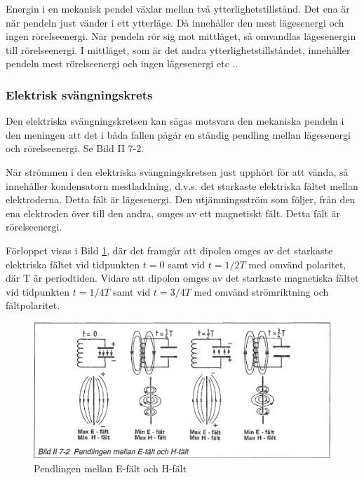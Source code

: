 Energin i en mekanisk pendel växlar mellan två
ytterlighetstillstånd. Det ena är när pendeln just vänder i ett
ytterläge. Då innehåller den mest lägesenergi och ingen
rörelseenergi. När pendeln rör sig mot mittläget, så omvandlas
lägesenergin till rörelseenergi. I mittläget, som är det andra
ytterlighetstillståndet, innehåller pendeln mest rörelseenergi och
ingen lägesenergi etc ..

\subsubsection{Elektrisk svängningskrets}

Den elektriska svängningskretsen kan sägas motsvara den mekaniska
pendeln i den meningen att det i båda fallen pågår en ständig pendling
mellan lägesenergi och rörelseenergi. Se Bild II 7-2.

När strömmen i den elektriska svängningskretsen just upphört för att
vända, så innehåller kondensatorn mestladdning, d.v.s.  det starkaste
elektriska fältet mellan elektroderna. Detta fält är lägesenergi. Den
utjämningsström som följer, från den ena elektroden över till den
andra, omges av ett magnetiskt fält. Detta fält är rörelseenergi.

Förloppet visas i Bild \ref{fig:BildII7-02}, där det framgår att dipolen omges av
det starkaste elektriska fältet vid tidpunkten \(t=0\) samt vid
\(t=1/2T\) med omvänd polaritet, där T är periodtiden. Vidare att
dipolen omges av det starkaste magnetiska fältet vid tidpunkten
\(t=1/4T\) samt vid \(t=3/4T\) med omvänd strömriktning och
fältpolaritet.

\begin{figure}[h]
\begin{center}
\includegraphics[width=14cm]{images/bild_2_7-02}
\caption{Pendlingen mellan E-fält och H-fält}
\label{fig:BildII7-02}
\end{center}
\end{figure}

